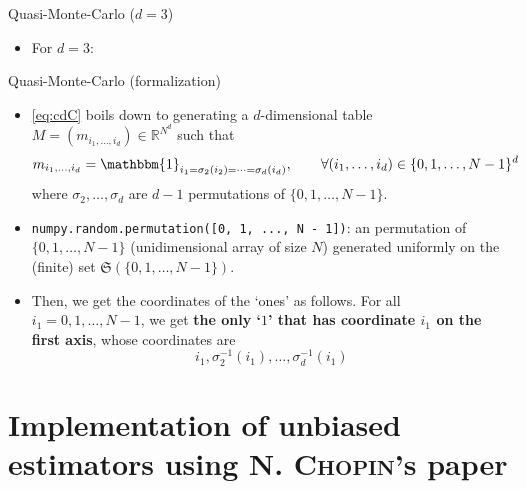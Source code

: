 \documentclass[aspectratio=169,xcolor=dvipsnames]{beamer}
\newcommand{\bdOne}{\mathbbm{1}}
\begin{document}
    \begin{frame}{Quasi-Monte-Carlo ($d = 3$)}
        \begin{itemize}
            \item For $d = 3$:
            \begin{center}
            \end{center}
        \end{itemize}
    \end{frame}

    \begin{frame}{Quasi-Monte-Carlo (formalization)}
        \begin{itemize}
            \item<1-> \eqref{eq:cdC} boils down to generating a $d$-dimensional table $M = (m_{i_1, \dots, i_d}) \in \mathbb{R}^{N^d}$ such that
            \[m_{i_1, \dots, i_d} = \bdOne_{i_1 = \sigma_2(i_2) = \cdots = \sigma_d(i_d)}, \qquad \forall (i_1, \dots, i_d) \in \{0, 1, \dots, N - 1\}^d\]
            where $\sigma_2, \dots, \sigma_d$ are $d - 1$ permutations of $\{0, 1, \dots, N - 1\}$.

            \item<2-> \texttt{numpy.random.permutation([0, 1, ..., N - 1])}: an permutation of $\{0, 1, \dots, N - 1\}$ (unidimensional array of size $N$) generated uniformly on the (finite) set $\mathfrak{S}(\{0, 1, \dots, N - 1\})$.

            \item<3-> Then, we get the coordinates of the `ones' as follows. For all $i_1 = 0, 1, \dots, N - 1$, we get \textbf{the only `$1$' that has coordinate $i_1$ on the first axis}, whose coordinates are
            \[i_1, \sigma_2^{-1}(i_1), \dots, \sigma_d^{-1}(i_1)\]
        \end{itemize}
    \end{frame}

    \section{Implementation of unbiased estimators using N. \textsc{Chopin}'s paper}
\end{document}
